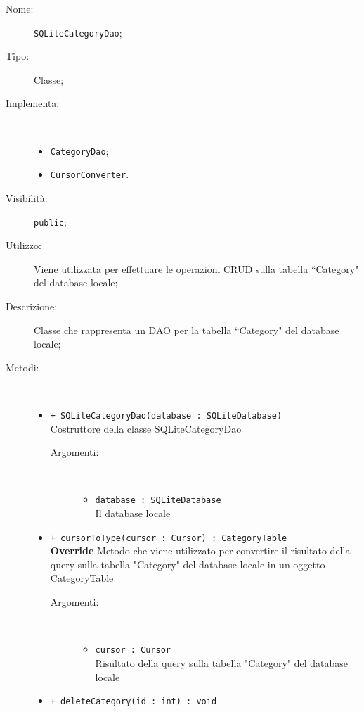 \documentclass[../DefinizioneDiProdotto.tex]{subfiles}
\begin{document}
\begin{description}
	\item[Nome:] \texttt{SQLiteCategoryDao};
	\item[Tipo:] Classe;
	\item[Implementa:] \
	\begin{itemize}
		\item \texttt{CategoryDao};
		
		\item \texttt{CursorConverter}.
		
	\end{itemize}
	\item[Visibilità:] \texttt{public};
	\item[Utilizzo:] Viene utilizzata per effettuare le operazioni CRUD sulla tabella “Category" del database locale;
	\item[Descrizione:] Classe che rappresenta un DAO per la tabella “Category" del database locale;
	\item[Metodi:] \
	\begin{itemize}
		\item \texttt{+ SQLiteCategoryDao(database : SQLiteDatabase)}\\
		Costruttore della classe SQLiteCategoryDao
		\begin{description}
			\item[Argomenti:] \
			\begin{itemize}
				\item \texttt{database : SQLiteDatabase}\\
				Il database locale\end{itemize}
		\end{description}
		\item \texttt{+ cursorToType(cursor : Cursor) : CategoryTable}\\
		\textbf{Override} Metodo che viene utilizzato per convertire il risultato della query sulla tabella "Category" del database locale in un oggetto CategoryTable
		\begin{description}
			\item[Argomenti:] \
			\begin{itemize}
				\item \texttt{cursor : Cursor}\\
				Risultato della query sulla tabella "Category" del database locale\end{itemize}
		\end{description}
		\item \texttt{+ deleteCategory(id : int) : void}\\

\end{itemize}
\end{description}
\end{document}
